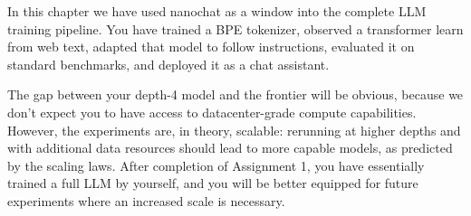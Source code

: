 In this chapter we have used nanochat as a window into the complete LLM training pipeline.  You have trained a BPE tokenizer, observed a transformer learn from web text, adapted that model to follow instructions, evaluated it on standard benchmarks, and deployed it as a chat assistant.

The gap between your depth-4 model and the frontier will be obvious, because we don't expect you to have access to datacenter-grade compute capabilities. However, the experiments are, in theory, scalable: rerunning at higher depths and with additional data resources should lead to more capable models, as predicted by the scaling laws. After completion of Assignment 1, you have essentially trained a full LLM by yourself, and you will be better equipped for future experiments where an increased scale is necessary.




